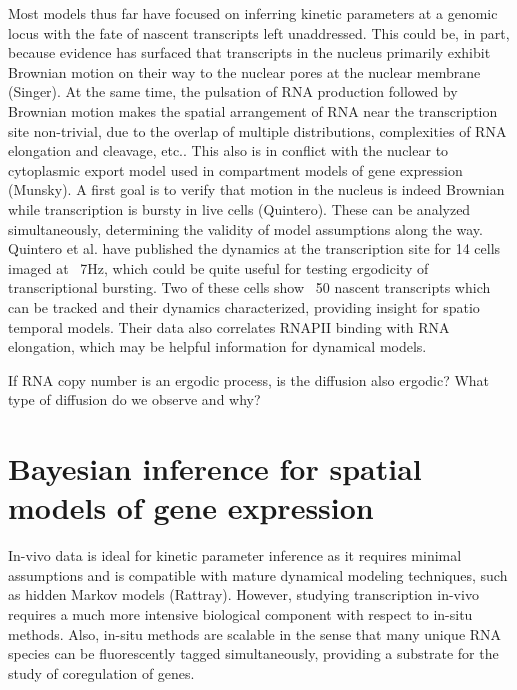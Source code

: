 \documentclass{article}
\begin{document}
Most models thus far have focused on inferring kinetic parameters at a genomic locus with the fate of nascent transcripts left unaddressed. This could be, in part, because evidence has surfaced that transcripts in the nucleus primarily exhibit Brownian motion on their way to the nuclear pores at the nuclear membrane (Singer). At the same time, the pulsation of RNA production followed by Brownian motion makes the spatial arrangement of RNA near the transcription site non-trivial, due to the overlap of multiple distributions, complexities of RNA elongation and cleavage, etc.. This also is in conflict with the nuclear to cytoplasmic export model used in compartment models of gene expression (Munsky). A first goal is to verify that motion in the nucleus is indeed Brownian while transcription is bursty in live cells (Quintero). These can be analyzed simultaneously, determining the validity of model assumptions along the way. Quintero et al. have published the dynamics at the transcription site for 14 cells imaged at ~7Hz, which could be quite useful for testing ergodicity of transcriptional bursting. Two of these cells show ~50 nascent transcripts which can be tracked and their dynamics characterized, providing insight for spatio temporal models. Their data also correlates RNAPII binding with RNA elongation, which may be helpful information for dynamical models.

If RNA copy number is an ergodic process, is the diffusion also ergodic? What type of diffusion do we observe and why? 

\section{Bayesian inference for spatial models of gene expression}

In-vivo data is ideal for kinetic parameter inference as it requires minimal assumptions and is compatible with mature dynamical modeling techniques, such as hidden Markov models (Rattray). However, studying transcription in-vivo requires a much more intensive biological component with respect to in-situ methods. Also, in-situ methods are scalable in the sense that many unique RNA species can be fluorescently tagged simultaneously, providing a substrate for the study of coregulation of genes.
\end{document}
